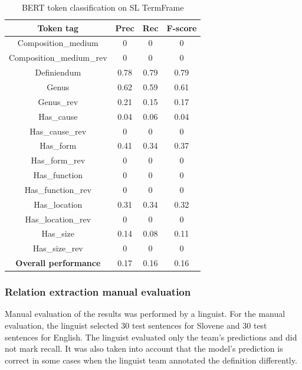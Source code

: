 \documentclass[fleqn,moreauthors,10pt]{ds_report}
\begin{document}
\begin{table}[!ht]
    \centering
    \begin{tabular}{|c|c|c|c|}
        \hline
        \textbf{Token tag} & \textbf{Prec} & \textbf{Rec} & \textbf{F-score} \\ \hline \hline
        Composition\_medium  &  0  &  0  &  0 \\ \hline
        Composition\_medium\_rev  &  0  &  0  &  0 \\ \hline
        Definiendum               &  0.78  &  0.79  &  0.79 \\ \hline
        Genus               &  0.62  &  0.59  &  0.61 \\ \hline
        Genus\_rev               &  0.21  &  0.15  &  0.17 \\ \hline
        Has\_cause           &  0.04  &  0.06  &  0.04 \\ \hline
        Has\_cause\_rev           &  0  &  0  &  0 \\ \hline
        Has\_form           &  0.41  &  0.34  &  0.37 \\ \hline
        Has\_form\_rev           &  0  &  0  &  0 \\ \hline
        Has\_function        & 0  &   0  &  0 \\ \hline
        Has\_function\_rev        & 0  &   0  &  0 \\ \hline
        Has\_location        &  0.31  &  0.34  &  0.32 \\ \hline
        Has\_location\_rev        &  0  &  0  &  0 \\ \hline
        Has\_size            & 0.14 &  0.08  &  0.11 \\ \hline
        Has\_size\_rev            & 0 &  0  &  0 \\ \hline \hline
        \textbf{Overall performance} & 0.17 & 0.16 & 0.16 \\ \hline
    \end{tabular}
    \caption{BERT token classification on SL TermFrame}
    \label{tab:tagger_all_slo}
\end{table}



\subsubsection{Relation extraction manual evaluation}
Manual evaluation of the results was performed by a linguist. For the manual evaluation, the linguist selected 30 test sentences for Slovene and 30 test sentences for English. The linguist evaluated only the team’s predictions and did not mark recall. It was also taken into account that the model’s prediction is correct in some cases when the linguist team annotated the definition differently.
\end{document}
